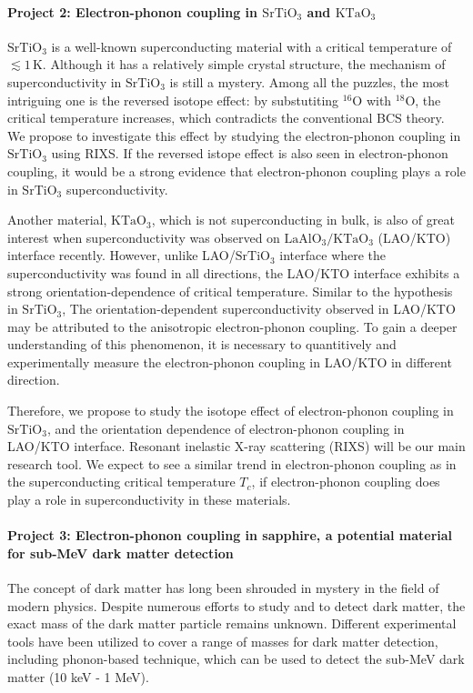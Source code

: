 \documentclass[11pt]{article}
\begin{document}
\paragraph{Project 2: Electron-phonon coupling in $\mathrm{SrTiO_{3}}$ and $\mathrm{KTaO_{3}}$} 
$\mathrm{SrTiO_{3}}$ is a well-known superconducting material with a critical temperature of $\lesssim 1\, \mathrm{K}$\cite{schooley_superconductivity_1964,lin_fermi_2013}. Although it has a relatively simple crystal structure, the mechanism of superconductivity in $\mathrm{SrTiO_{3}}$ is still a mystery. Among all the puzzles, the most intriguing one is the reversed isotope effect: by substutiting ${}^{16}\mathrm{O}$ with ${}^{18}\mathrm{O}$, the critical temperature increases, which contradicts the conventional BCS theory\cite{stucky_isotope_2016}. We propose to investigate this effect by studying the electron-phonon coupling in $\mathrm{SrTiO_{3}}$ using RIXS. If the reversed istope effect is also seen in electron-phonon coupling, it would be a strong evidence that electron-phonon coupling plays a role in $\mathrm{SrTiO_{3}}$ superconductivity.

Another material, $\mathrm{KTaO_{3}}$, which is not superconducting in bulk, is also of great interest when superconductivity was observed on $\mathrm{LaAlO_{3}/KTaO_{3}}$ (LAO/KTO) interface recently\cite{ren_two-dimensional_2022}. However, unlike LAO/$\mathrm{SrTiO_{3}}$ interface where the superconductivity was found in all directions, the LAO/KTO interface exhibits a strong orientation-dependence of critical temperature\cite{ren_two-dimensional_2022,chen_two-dimensional_2021}. Similar to the hypothesis in $\mathrm{SrTiO_{3}}$, The orientation-dependent superconductivity observed in LAO/KTO may be attributed to the anisotropic electron-phonon coupling. To gain a deeper understanding of this phenomenon, it is necessary to quantitively and experimentally measure the electron-phonon coupling in LAO/KTO in different direction.


Therefore, we propose to study the isotope effect of electron-phonon coupling in $\mathrm{SrTiO_{3}}$, and the orientation dependence of electron-phonon coupling in LAO/KTO interface. Resonant inelastic X-ray scattering (RIXS) will be our main research tool. We expect to see a similar trend in electron-phonon coupling as in the superconducting critical temperature $T_{c}$, if electron-phonon coupling does play a role in superconductivity in these materials.



\paragraph{Project 3: Electron-phonon coupling in sapphire, a potential material for sub-MeV dark matter detection}
The concept of dark matter has long been shrouded in mystery in the field of modern physics. Despite numerous efforts to study and to detect dark matter, the exact mass of the dark matter particle remains unknown. Different experimental tools have been utilized to cover a range of masses for dark matter detection, including phonon-based technique, which can be used to detect the sub-MeV dark matter (10 keV - 1 MeV).
  
\end{document}
